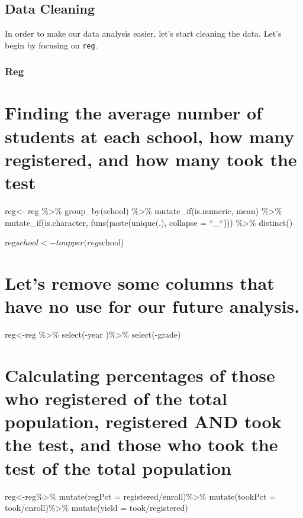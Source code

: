 \documentclass[]{article}
\begin{document}
\subsection{Data Cleaning}\label{data-cleaning}

In order to make our data analysis easier, let's start cleaning the
data. Let's begin by focusing on \texttt{reg}.

\subsubsection{Reg}\label{reg}

\section{Finding the average number of students at each school, how many
registered, and how many took the
test}\label{finding-the-average-number-of-students-at-each-school-how-many-registered-and-how-many-took-the-test}

reg\textless{}- reg \%\textgreater{}\% group\_by(school)
\%\textgreater{}\% mutate\_if(is.numeric, mean) \%\textgreater{}\%
mutate\_if(is.character, funs(paste(unique(.), collapse = ``\_``)))
\%\textgreater{}\% distinct()

reg\(school<-toupper(reg\)school)

\section{Let's remove some columns that have no use for our future
analysis.}\label{lets-remove-some-columns-that-have-no-use-for-our-future-analysis.}

reg\textless{}-reg \%\textgreater{}\% select(-year )\%\textgreater{}\%
select(-grade)

\section{Calculating percentages of those who registered of the total
population, registered AND took the test, and those who took the test of
the total
population}\label{calculating-percentages-of-those-who-registered-of-the-total-population-registered-and-took-the-test-and-those-who-took-the-test-of-the-total-population}

reg\textless{}-reg\%\textgreater{}\% mutate(regPct =
registered/enroll)\%\textgreater{}\% mutate(tookPct =
took/enroll)\%\textgreater{}\% mutate(yield = took/registered)
\end{document}
